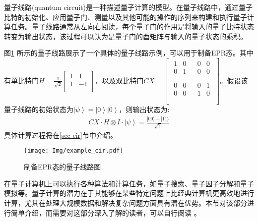 量子线路(quantum circuit)是一种描述量子计算的模型。在量子线路中，通过量子比特的初始化、应用量子门、测量以及其他可能的操作的序列来构建和执行量子计算任务。量子线路通常从左向右阅读，每个量子门的作用是将输入的量子比特状态转变为输出状态，该过程可以认为是量子门的酉矩阵与输入的量子状态的乘积。
\begin{example}
    \label{ex-epr}
    图\ref{fig:example_cir} 所示的量子线路展示了一个具体的量子线路示例，可以用于制备EPR态。其中有单比特门\(H=\frac{1}{\sqrt2}\left[\begin{matrix}1&1\\1&-1\\\end{matrix}\right]\)，以及双比特门\(CX=\left[\begin{matrix}\begin{matrix}1&0\\0&1\\\end{matrix}&\begin{matrix}0&0\\0&0\\\end{matrix}\\\begin{matrix}0&0\\0&0\\\end{matrix}&\begin{matrix}0&1\\1&0\\\end{matrix}\\\end{matrix}\right]\)。假设该量子线路的初始状态为\(\left|\psi\right\rangle=\left|0\right\rangle\left|0\right\rangle\)，则输出状态为:
\begin{align}
   CX\cdot H\otimes I \cdot \left|\psi\right\rangle = \frac{|00\rangle+|11\rangle}{\sqrt{2}}
\end{align}
具体计算过程将在\ref{sec-cir}节中介绍。
\end{example}
\begin{figure}[!htbp]
    \centering
    \texttt{[image: Img/example\_cir.pdf]}
    \caption{制备EPR态的量子线路图}
    \label{fig:example_cir}
\end{figure}



在量子计算机上可以执行各种算法和计算任务，如量子搜索\citep{Grover_1996}、量子因子分解\citep{Shor}和量子模拟\citep{Feynman}等。量子计算的潜力在于其能够在某些特定问题上比经典计算机更高效地进行计算，尤其在处理大规模数据和解决复杂问题方面具有潜在优势。本节对该部分进行简单介绍，而需要对这部分深入了解的读者，可以自行阅读
\citep{nielsen2010quantum}。
